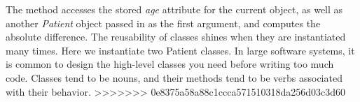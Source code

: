 The  method accesses the stored \textit{age} attribute for the current object, as well as another \textit{Patient} object passed in as the first argument, and computes the absolute difference.
The reusability of classes shines when they are instantiated many times. Here we instantiate two Patient classes.
In large software systems, it is common to design the high-level classes you need before writing too much code.
Classes tend to be nouns, and their methods tend to be verbs associated with their behavior.
>>>>>>> 0e8375a58a88c1ccca571510318da256d03c3d60
